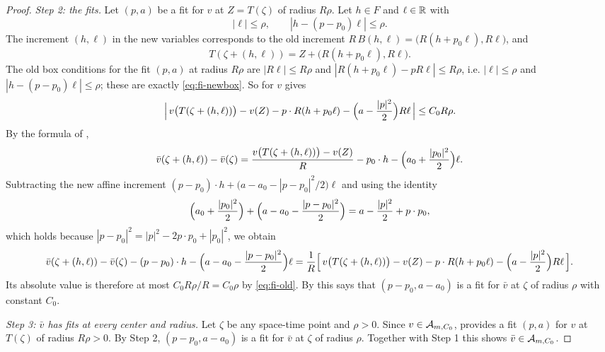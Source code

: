 \begin{proof}
\emph{Step 2: the fits.}
Let $(p,a)$ be a fit for $v$ at $Z=T(\zeta)$ of radius $R\rho$. Let $h\in F$ and
$\ell\in\mathbb{R}$ with
\begin{equation}\label{eq:fi-newbox}
  |\ell|\le\rho,\qquad |h-(p-p_0)\ell|\le\rho .
\end{equation}
The increment $(h,\ell)$ in the new variables corresponds to the old increment
$R\,B(h,\ell)=\bigl(R(h+p_0\ell),R\ell\bigr)$, and
\[
  T(\zeta+(h,\ell))=Z+\bigl(R(h+p_0\ell),R\ell\bigr).
\]
The old box conditions for the fit $(p,a)$ at radius $R\rho$ are
$|R\ell|\le R\rho$ and $|R(h+p_0\ell)-pR\ell|\le R\rho$, i.e. $|\ell|\le\rho$
and $|h-(p-p_0)\ell|\le\rho$; these are exactly \eqref{eq:fi-newbox}. So
 for $v$ gives
\begin{equation}\label{eq:fi-old}
  \Bigl|\,v\bigl(T(\zeta+(h,\ell))\bigr)-v(Z)
    -p\cdot R(h+p_0\ell)-\Bigl(a-\frac{|p|^2}2\Bigr)R\ell\,\Bigr|
  \le C_0R\rho .
\end{equation}
By the formula of ,
\[
  \bar v(\zeta+(h,\ell))-\bar v(\zeta)
   =\frac{v\bigl(T(\zeta+(h,\ell))\bigr)-v(Z)}{R}
      -p_0\cdot h-\Bigl(a_0+\frac{|p_0|^2}2\Bigr)\ell .
\]
Subtracting the new affine increment
$(p-p_0)\cdot h+\bigl(a-a_0-|p-p_0|^2/2\bigr)\ell$ and using the identity
\[
  \Bigl(a_0+\frac{|p_0|^2}2\Bigr)+\Bigl(a-a_0-\frac{|p-p_0|^2}2\Bigr)
   =a-\frac{|p|^2}2+p\cdot p_0,
\]
which holds because
$|p-p_0|^2=|p|^2-2p\cdot p_0+|p_0|^2$, we obtain
\[
  \bar v(\zeta+(h,\ell))-\bar v(\zeta)-(p-p_0)\cdot h
     -\Bigl(a-a_0-\frac{|p-p_0|^2}2\Bigr)\ell
  =\frac1R\Bigl[\,v\bigl(T(\zeta+(h,\ell))\bigr)-v(Z)
     -p\cdot R(h+p_0\ell)-\Bigl(a-\frac{|p|^2}2\Bigr)R\ell\,\Bigr].
\]
Its absolute value is therefore at most $C_0R\rho/R=C_0\rho$ by
\eqref{eq:fi-old}. By  this says that $(p-p_0,a-a_0)$ is a fit
for $\bar v$ at $\zeta$ of radius $\rho$ with constant $C_0$.

\emph{Step 3: $\bar v$ has fits at every center and radius.}
Let $\zeta$ be any space-time point and $\rho>0$. Since $v\in\mathcal{A}_{m,C_0}$,
 provides a fit $(p,a)$ for $v$ at $T(\zeta)$ of radius
$R\rho>0$. By Step 2, $(p-p_0,a-a_0)$ is a fit for $\bar v$ at $\zeta$ of radius
$\rho$. Together with Step 1 this shows $\bar v\in\mathcal{A}_{m,C_0}$.
\end{proof}
